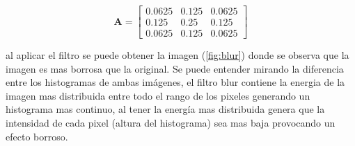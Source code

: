 \begin{equation}
\textbf{A}=\begin{bmatrix}
0.0625 &0.125 &0.0625\\
0.125 &0.25 &0.125\\
0.0625 &0.125 &0.0625
\end{bmatrix}
\end{equation}

al aplicar el filtro se puede obtener la imagen (\ref{fig:blur}) donde se observa que la imagen es mas borrosa que la original. Se puede entender mirando la diferencia entre los histogramas de ambas imágenes, el filtro blur contiene la energia de la imagen mas distribuida entre todo el rango de los pixeles generando un histograma mas continuo, al tener la energía mas distribuida genera que la intensidad de cada pixel (altura del histograma) sea mas baja provocando un efecto borroso.

